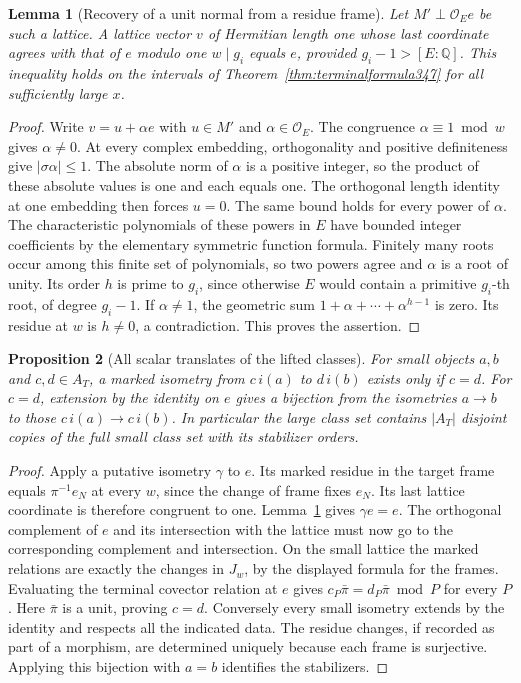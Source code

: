\documentclass[a4paper,11pt]{article}
\newtheorem{proposition}{Proposition}[section]
\newtheorem{lemma}[proposition]{Lemma}
\theoremstyle{definition}
\theoremstyle{remark}
\numberwithin{equation}{section}
\begin{document}
\begin{lemma}[Recovery of a unit normal from a residue frame]\leavevmode
\label{lem:markedline350}
Let \(M'\perp\mathcal O_Ee\) be such a lattice. A lattice vector
\(v\) of Hermitian length one whose last coordinate agrees with
that of \(e\) modulo one \(w\mid g_i\) equals \(e\), provided
\(g_i-1>[E:\mathbb Q]\). This inequality holds on the intervals
of Theorem~\ref{thm:terminalformula347} for all sufficiently large \(x\).
\end{lemma}
\begin{proof}
Write \(v=u+\alpha e\) with \(u\in M'\) and \(\alpha\in\mathcal O_E\).
The congruence \(\alpha\equiv1\bmod w\) gives \(\alpha\ne0\).
At every complex embedding, orthogonality and positive definiteness
give \(|\sigma\alpha|\le1\). The absolute norm of \(\alpha\) is a
positive integer, so the product of these absolute values is one
and each equals one. The orthogonal length identity at one embedding
then forces \(u=0\). The same bound holds for every power of
\(\alpha\). The characteristic polynomials of these powers in
\(E\) have bounded integer coefficients by the elementary
symmetric function formula. Finitely many roots occur among this
finite set of polynomials, so two powers agree and \(\alpha\) is
a root of unity. Its order \(h\) is prime to \(g_i\), since
otherwise \(E\) would contain a primitive \(g_i\)-th root, of
degree \(g_i-1\). If \(\alpha\ne1\), the geometric sum
\(1+\alpha+\cdots+\alpha^{h-1}\) is zero. Its residue at \(w\)
is \(h\ne0\), a contradiction. This proves the assertion.
\end{proof}

\begin{proposition}[All scalar translates of the lifted classes]\leavevmode
\label{prop:scalarlifts350}
For small objects \(a,b\) and \(c,d\in A_T\), a marked isometry
from \(c\,i(a)\) to \(d\,i(b)\) exists only if \(c=d\).
For \(c=d\), extension by the identity on \(e\) gives a bijection
from the isometries \(a\longrightarrow b\) to those
\(c\,i(a)\longrightarrow c\,i(b)\). In particular the large
class set contains \( |A_T| \) disjoint copies of the full small
class set with its stabilizer orders.
\end{proposition}
\begin{proof}
Apply a putative isometry \(\gamma\) to \(e\). Its marked residue
in the target frame equals \(\pi^{-1}e_N\) at every \(w\), since
the change of frame fixes \(e_N\). Its last lattice coordinate
is therefore congruent to one. Lemma~\ref{lem:markedline350}
gives \(\gamma e=e\). The orthogonal complement of \(e\) and
its intersection with the lattice must now go to the corresponding
complement and intersection. On the small lattice the marked
relations are exactly the changes in \(J_w\), by the displayed
formula for the frames. Evaluating the terminal covector relation
at \(e\) gives \(c_P\bar\pi=d_P\bar\pi\bmod P\) for every \(P\).
Here \(\bar\pi\) is a unit, proving \(c=d\). Conversely every
small isometry extends by the identity and respects all the
indicated data. The residue changes, if recorded as part of a
morphism, are determined uniquely because each frame is surjective.
Applying this bijection with \(a=b\) identifies the stabilizers.
\end{proof}
\end{document}
